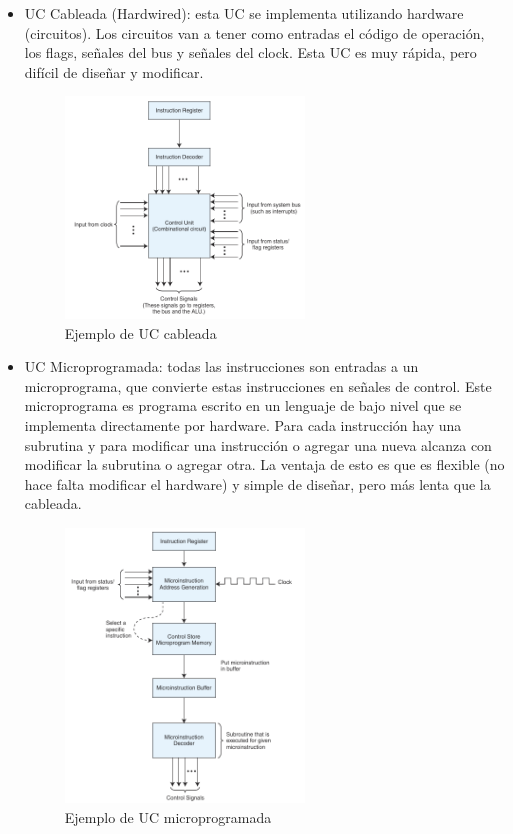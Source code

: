\documentclass[a4paper,12pt]{article}
\begin{document}
\begin{itemize}
  \item UC Cableada (Hardwired): esta UC se implementa utilizando hardware (circuitos). Los circuitos van a tener
  como entradas el código de operación, los flags, señales del bus y señales del clock. Esta UC es muy rápida,
  pero difícil de diseñar y modificar.

  \begin{figure}[ht!]
    \centering
     \includegraphics[width=0.6\textwidth]{Imagenes/UC_HARDWIRED.png}
    \caption{Ejemplo de UC cableada}
    \label{UC_HARDWIRED}
  \end{figure}

  \item UC Microprogramada: todas las instrucciones son entradas a un microprograma, que convierte estas instrucciones en señales de
  control. Este microprograma es programa escrito en un lenguaje de bajo nivel que se implementa directamente por hardware.
  Para cada instrucción hay una subrutina y para modificar una instrucción o agregar una nueva alcanza con modificar la subrutina o
  agregar otra. La ventaja de esto es que es flexible (no hace falta modificar el hardware) y simple de diseñar, pero más lenta que la cableada.
  \begin{figure}[ht!]
    \centering
     \includegraphics[width=0.6\textwidth]{Imagenes/UC_MICRO.png}
    \caption{Ejemplo de UC microprogramada}
    \label{UC_MICRO}
  \end{figure}
\end{itemize}
\end{document}

